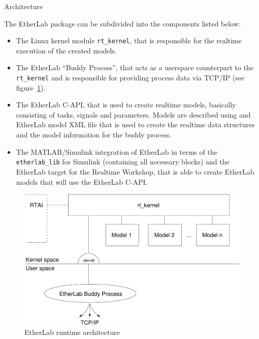 \begin{ighsec}{Architecture}
\label{sec:arch}

The EtherLab package can be subdivided into the components listed below:

\begin{itemize}

\item The Linux kernel module \texttt{rt\_kernel}, that is responsible for the
realtime execution of the created models.

\item The EtherLab ``Buddy Process'', that acts as a userspace counterpart to
the \texttt{rt\_kernel} and is responsible for providing process data via
TCP/IP (see figure~\ref{fig:architektur}).

\item The EtherLab C-API, that is used to create realtime models, basically
consisting of tasks, signals and parameters. Models are described using and
EtherLab model XML file that is used to create the realtime data structures
and the model information for the buddy process.

\item The MATLAB/Simulink integration of EtherLab in terms of the
\texttt{etherlab\_lib} for Simulink (containing all necessary blocks) and the
EtherLab target for the Realtime Workshop, that is able to create EtherLab
models that will use the EtherLab C-API.

\end{itemize}

\begin{figure}[H]
  \begin{center}
    \includegraphics[width=\textwidth]{images/etl-arch}
    \caption{EtherLab runtime architecture}
    \label{fig:architektur}
  \end{center}
\end{figure}

\end{ighsec}

